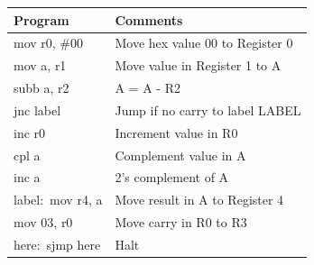 \documentclass[12pt,a4paper]{article}
\begin{document}
\begin{flushleft}
\begin{table}[htb]
\centering
\begin{tabular}{|l|l|} 
\hline
\textbf{Program}                                                 & \textbf{Comments}                             \\ 
\hline
\hline
mov r0, \#00                                                      & Move hex value 00 to Register 0               \\
\hline
mov a, r1                                                        & Move value in Register 1 to A                 \\
\hline
subb a, r2                                                        & A = A - R2                                    \\
\hline
jnc label                                                        & Jump if no carry to label LABEL               \\
\hline
inc r0                                                           & Increment value in R0                         \\
\hline
cpl a                                                            & Complement value in A                         \\
\hline
inc a                                                            & 2's complement of A                           \\
\hline
label:~mov r4, a                                                 & Move result in A to Register 4                \\
\hline
mov 03, r0                                                       & Move carry in R0 to R3                        \\
\hline
here:~sjmp here                                                  & Halt                                          \\
\hline
\end{tabular}
\end{table}


\end{flushleft}
\end{document}
